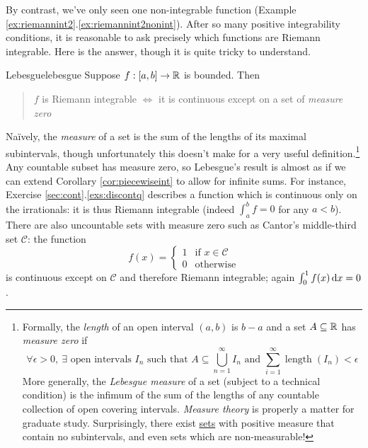 By contrast, we've only seen one non-integrable function (Example \ref*{ex:riemannint2}.\ref{ex:riemannint2nonint}). After so many positive integrability conditions, it is reasonable to ask precisely which functions are Riemann integrable. Here is the answer, though it is quite tricky to understand.

\begin{thm}{Lebesgue}{lebesgue}
	Suppose $f:[a,b]\to\mathbb{R}$ is bounded. Then
	\begin{quote}
		$f$ is Riemann integrable $\iff$ it is continuous except on a set of \emph{measure zero}
	\end{quote}
\end{thm}

Naïvely, the \emph{measure} of a set is the sum of the lengths of its maximal subintervals, though unfortunately this doesn't make for a very useful definition.\footnote{%
	Formally, the \emph{length} of an open interval $(a,b)$ is $b-a$ and a set $A\subseteq \mathbb{R}$ has \emph{measure zero} if
	\[
		\forall\epsilon>0,\ \exists \text{ open intervals $I_n$ such that }
		A\subseteq\bigcup_{n=1}^\infty I_n
		\text{ and }
		\sum_{i=1}^\infty\operatorname{length}(I_n)<\epsilon
	\]
	More generally, the \emph{Lebesgue measure} of a set (subject to a technical condition) is the infimum of the sum of the lengths of any countable collection of open covering intervals. \emph{Measure theory} is properly a matter for graduate study.	Surprisingly, there exist \href{https://en.wikipedia.org/wiki/Smith-Volterra-Cantor_set}{sets} with positive measure that contain no subintervals, and even sets which are non-measurable!%
}
Any countable subset has measure zero, so Lebesgue's result is almost as if we can extend Corollary \ref{cor:piecewiseint} to allow for infinite sums. For instance, Exercise \ref*{sec:cont}.\ref{exs:discontq} describes a function which is continuous only on the irrationals: it is thus Riemann integrable (indeed $\int_a^bf=0$ for any $a<b$). There are also uncountable sets with measure zero such as Cantor's middle-third set $\mathcal C$: the function
\[
	f(x)=
	\begin{cases}
		1&\text{if }x\in\mathcal C\\
		0&\text{otherwise}
	\end{cases}
\]
is continuous except on $\mathcal C$ and therefore Riemann integrable; again $\int_0^1 f(x)\,{\mathrm{d} x}=0$.


\vfil

